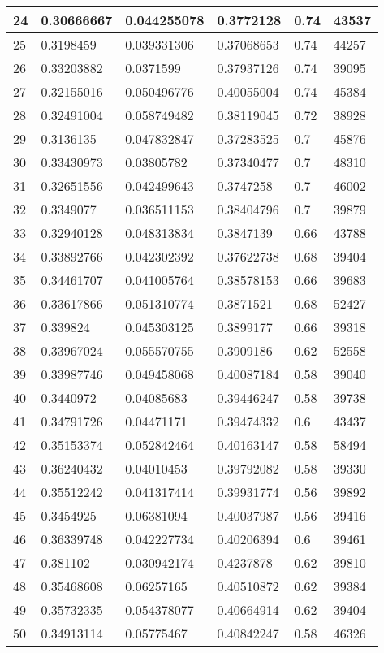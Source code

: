 \begin{longtable}{|l|l|l|l|l|l|}
24 & 0.30666667 & 0.044255078 & 0.3772128 & 0.74 & 43537 \\ \hline 
25 & 0.3198459 & 0.039331306 & 0.37068653 & 0.74 & 44257 \\ \hline 
26 & 0.33203882 & 0.0371599 & 0.37937126 & 0.74 & 39095 \\ \hline 
27 & 0.32155016 & 0.050496776 & 0.40055004 & 0.74 & 45384 \\ \hline 
28 & 0.32491004 & 0.058749482 & 0.38119045 & 0.72 & 38928 \\ \hline 
29 & 0.3136135 & 0.047832847 & 0.37283525 & 0.7 & 45876 \\ \hline 
30 & 0.33430973 & 0.03805782 & 0.37340477 & 0.7 & 48310 \\ \hline 
31 & 0.32651556 & 0.042499643 & 0.3747258 & 0.7 & 46002 \\ \hline 
32 & 0.3349077 & 0.036511153 & 0.38404796 & 0.7 & 39879 \\ \hline 
33 & 0.32940128 & 0.048313834 & 0.3847139 & 0.66 & 43788 \\ \hline 
34 & 0.33892766 & 0.042302392 & 0.37622738 & 0.68 & 39404 \\ \hline 
35 & 0.34461707 & 0.041005764 & 0.38578153 & 0.66 & 39683 \\ \hline 
36 & 0.33617866 & 0.051310774 & 0.3871521 & 0.68 & 52427 \\ \hline 
37 & 0.339824 & 0.045303125 & 0.3899177 & 0.66 & 39318 \\ \hline 
38 & 0.33967024 & 0.055570755 & 0.3909186 & 0.62 & 52558 \\ \hline 
39 & 0.33987746 & 0.049458068 & 0.40087184 & 0.58 & 39040 \\ \hline 
40 & 0.3440972 & 0.04085683 & 0.39446247 & 0.58 & 39738 \\ \hline 
41 & 0.34791726 & 0.04471171 & 0.39474332 & 0.6 & 43437 \\ \hline 
42 & 0.35153374 & 0.052842464 & 0.40163147 & 0.58 & 58494 \\ \hline 
43 & 0.36240432 & 0.04010453 & 0.39792082 & 0.58 & 39330 \\ \hline 
44 & 0.35512242 & 0.041317414 & 0.39931774 & 0.56 & 39892 \\ \hline 
45 & 0.3454925 & 0.06381094 & 0.40037987 & 0.56 & 39416 \\ \hline 
46 & 0.36339748 & 0.042227734 & 0.40206394 & 0.6 & 39461 \\ \hline 
47 & 0.381102 & 0.030942174 & 0.4237878 & 0.62 & 39810 \\ \hline 
48 & 0.35468608 & 0.06257165 & 0.40510872 & 0.62 & 39384 \\ \hline 
49 & 0.35732335 & 0.054378077 & 0.40664914 & 0.62 & 39404 \\ \hline 
50 & 0.34913114 & 0.05775467 & 0.40842247 & 0.58 & 46326 \\ \hline 
\end{longtable}